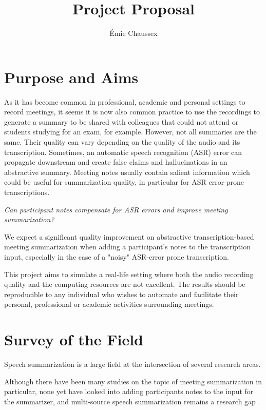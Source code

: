 \documentclass[11pt]{article}
\title{Project Proposal}
\author{Émie Chaussex}
\date{}
\begin{document}
\maketitle

\section{Purpose and Aims}

As it has become common in professional, academic and personal settings to record meetings, it seems it is now also common practice to use the recordings to generate a summary to be shared with colleagues that could not attend or students studying for an exam, for example.
However, not all summaries are the same.
Their quality can vary depending on the quality of the audio and its transcription.
Sometimes, an automatic speech recognition (ASR) error can propagate downstream and create false claims and hallucinations in an abstractive summary.
Meeting notes usually contain salient information which could be useful for summarization quality, in particular for ASR error-prone transcriptions.

\textit{Can participant notes compensate for ASR errors and improve meeting summarization?}

We expect a significant quality improvement on abstractive transcription-based meeting summarization when adding a participant's notes to the transcription input, especially in the case of a "noisy" ASR-error prone transcription.

This project aims to simulate a real-life setting where both the audio recording quality and the computing resources are not excellent.
The results should be reproducible to any individual who wishes to automate and facilitate their personal, professional or academic activities surrounding meetings.

\section{Survey of the Field}

Speech summarization is a large field at the intersection of several research areas.

Although there have been many studies on the topic of meeting summarization in particular, none yet have looked into adding participants notes to the input for the summarizer, and multi-source speech summarization remains a research gap \citep{retkowski-etal-2025-survey}.
\end{document}
